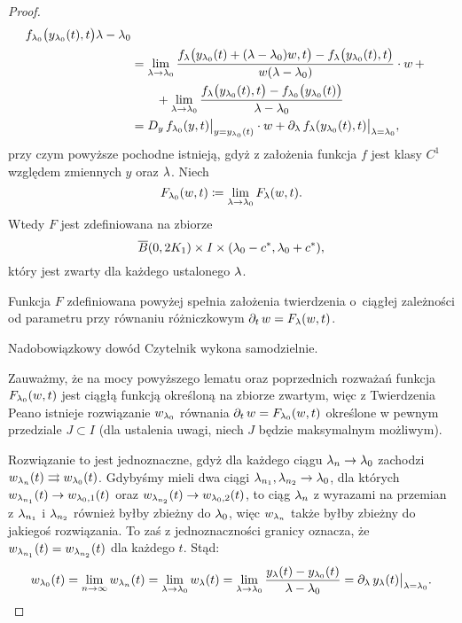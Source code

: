 \begin{proof}
\begin{align}
{    f_{\l_0} \p[\big]{y_{\l_0}(t), t} }{ \l - \l_0 } \notag \\ 
    &=  \lim_{\l \to \l_0} \frac{ f_\l \p[\big]{y_{\l_0}(t) + (\l - \l_0)w, t} -  f_\l \p[\big]{y_{\l_0}(t), t} }{ w(\l 
    - \l_0) } \cdot w \, + \notag \\
    &\qquad+ \lim_{\l \to \l_0} \frac{ f_\l\p[\big]{y_{\l_0}(t), t} - f_{\l_0} \p[\big]{y_{\l_0}(t)} }{ \l - \l_0 } \notag \\
    &= D_y \, f_{\l_0} (y, t) \big\vert_{ y = y_{\l_0}(t) } \cdot w + \pd{ \l } f_{\l}( y_{\l_0}(t), t) 
    \big\vert_{ \l = \l_0 }, \label{eq: var}
  \end{align}
%
  przy czym powyższe pochodne istnieją, gdyż z założenia funkcja $f$ jest klasy $C^1$ względem zmiennych $y$ oraz $\l$. 
  Niech
%
  \begin{equation*}
    F_{\l_0}(w, t) \coloneqq \lim_{\l \to \l_0} F_\l(w, t).
  \end{equation*}
%
  Wtedy $F$ jest zdefiniowana na zbiorze
%
  \begin{equation*}
    \overline{B}(0, 2K_1) \times I \times (\l_0 - c^*, \l_0 + c^*),
  \end{equation*}
%
  który jest zwarty dla każdego ustalonego $\l$.
%
  \begin{nestedlemma}
    Funkcja $F$ zdefiniowana powyżej spełnia założenia twierdzenia o~ciągłej zależności od parametru przy równaniu 
    różniczkowym $\pd{t} w = F_\l(w, t)$.
  \end{nestedlemma}
%
  \begin{nestedproof}
    Nadobowiązkowy dowód Czytelnik wykona samodzielnie.
  \end{nestedproof}
%
  Zauważmy, że na mocy powyższego lematu oraz poprzednich rozważań funkcja $F_{\l_0}(w, t)$ jest ciągłą funkcją określoną
  na zbiorze zwartym, więc z Twierdzenia Peano istnieje rozwiązanie $w_{\l_0}$ równania $\pd{t} w = F_{\l_0}(w, t)$  określone w pewnym przedziale $J \subset I$ (dla ustalenia uwagi, niech $J$ będzie maksymalnym możliwym). 
  
  Rozwiązanie to jest jednoznaczne, gdyż dla każdego ciągu $\l_n \to \l_0$ zachodzi $w_{\l_n}(t) \rightrightarrows 
  w_{\l_0}(t)$. Gdybyśmy mieli dwa ciągi $\l_{n_1}, \l_{n_2} \to \l_0$, dla których $w_{\l_{n_1}}(t) \to w_{\l_0, 1}(t)$ oraz 
  $w_{\l_{n_2}}(t) \to w_{\l_0, 2}(t)$, to ciąg $\l_{n}$ z wyrazami na przemian z $\l_{n_1}$ i $\l_{n_2}$ również byłby zbieżny do $\l_0$, więc $w_{\l_{n}}$ także byłby zbieżny do jakiegoś rozwiązania. To zaś z jednoznaczności granicy oznacza, że $w_{\l_{n_1}}(t) = w_{\l_{n_2}}(t)$ dla każdego $t$. Stąd:
%
  \begin{equation*}
    w_{\l_0}(t) = \lim_{n \to \infty} w_{\l_n}(t) = \lim_{\l \to \l_0} w_{\l}(t) = \lim_{\l \to \l_0} \frac{ y_\l(t) - 
  	y_{\l_0}(t) }{ \l - \l_0 } = \pd{ \l } y_\l(t) \big\vert_{ \l = \l_0 }.
  \end{equation*}
%
  

\end{proof}
